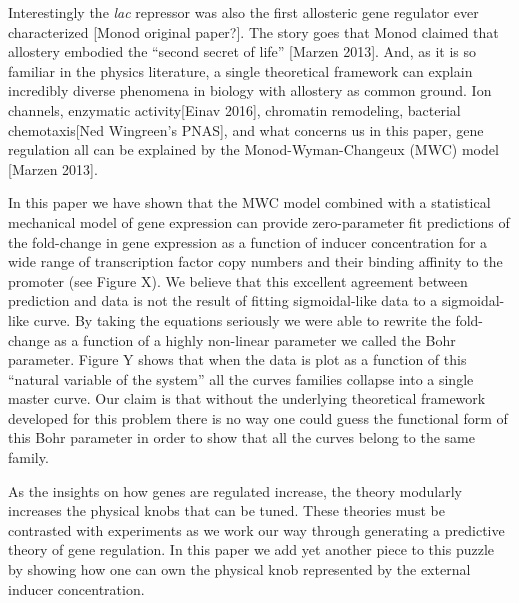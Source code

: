 Interestingly the \textit{lac} repressor was also the first allosteric gene
regulator ever characterized [Monod original paper?]. The story goes that Monod
claimed that allostery embodied the ``second secret of life'' [Marzen 2013].
And, as it is so familiar in the physics literature, a single theoretical
framework can explain incredibly diverse phenomena in biology with allostery as
common ground. Ion channels, enzymatic activity[Einav 2016], chromatin
remodeling, bacterial chemotaxis[Ned Wingreen's PNAS], and what concerns us in
this paper, gene regulation all can be explained by the Monod-Wyman-Changeux
(MWC) model [Marzen 2013].

In this paper we have shown that the MWC model combined with a statistical
mechanical model of gene expression can provide zero-parameter fit predictions
of the fold-change in gene expression as a function of inducer concentration for
a wide range of transcription factor copy numbers and their binding affinity to
the promoter (see Figure X). We believe that this excellent agreement between
prediction and data is not the result of fitting sigmoidal-like data to a
sigmoidal-like curve. By taking the equations seriously we were able to rewrite
the fold-change as a function of a highly non-linear parameter we called the
Bohr parameter. Figure Y shows that when the data is plot as a function of this
``natural variable of the system'' all the curves families collapse into a
single master curve. Our claim is that without the underlying theoretical
framework developed for this problem there is no way one could guess the
functional form of this Bohr parameter in order to show that all the curves
belong to the same family.

As the insights on how genes are regulated increase, the theory modularly
increases the physical knobs that can be tuned. These theories must be
contrasted with experiments as we work our way through generating a predictive
theory of gene regulation. In this paper we add yet another piece to this puzzle
by showing how one can own the physical knob represented by the external inducer
concentration.
